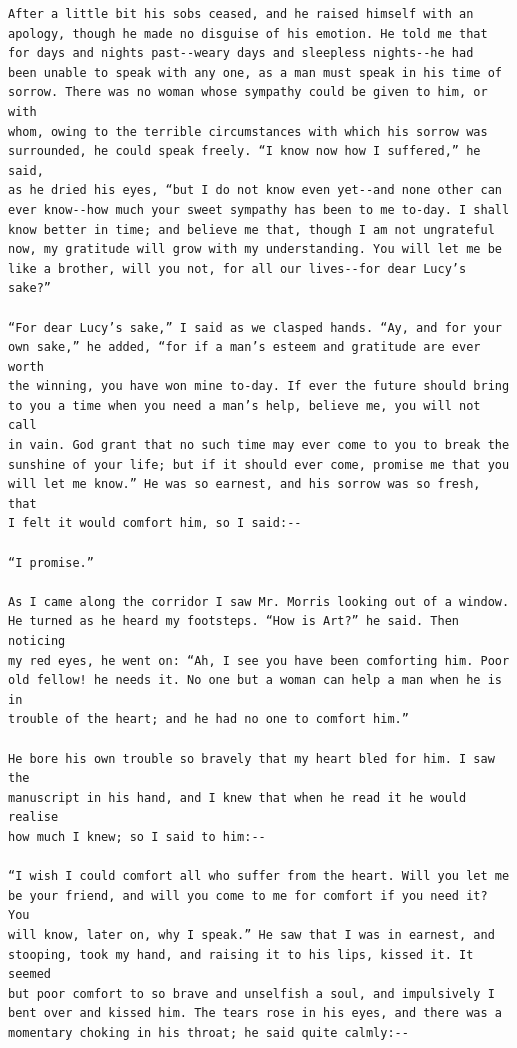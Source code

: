 \documentclass{article}
\begin{document}
\begin{verbatim}
After a little bit his sobs ceased, and he raised himself with an
apology, though he made no disguise of his emotion. He told me that
for days and nights past--weary days and sleepless nights--he had
been unable to speak with any one, as a man must speak in his time of
sorrow. There was no woman whose sympathy could be given to him, or with
whom, owing to the terrible circumstances with which his sorrow was
surrounded, he could speak freely. “I know now how I suffered,” he said,
as he dried his eyes, “but I do not know even yet--and none other can
ever know--how much your sweet sympathy has been to me to-day. I shall
know better in time; and believe me that, though I am not ungrateful
now, my gratitude will grow with my understanding. You will let me be
like a brother, will you not, for all our lives--for dear Lucy’s sake?”

“For dear Lucy’s sake,” I said as we clasped hands. “Ay, and for your
own sake,” he added, “for if a man’s esteem and gratitude are ever worth
the winning, you have won mine to-day. If ever the future should bring
to you a time when you need a man’s help, believe me, you will not call
in vain. God grant that no such time may ever come to you to break the
sunshine of your life; but if it should ever come, promise me that you
will let me know.” He was so earnest, and his sorrow was so fresh, that
I felt it would comfort him, so I said:--

“I promise.”

As I came along the corridor I saw Mr. Morris looking out of a window.
He turned as he heard my footsteps. “How is Art?” he said. Then noticing
my red eyes, he went on: “Ah, I see you have been comforting him. Poor
old fellow! he needs it. No one but a woman can help a man when he is in
trouble of the heart; and he had no one to comfort him.”

He bore his own trouble so bravely that my heart bled for him. I saw the
manuscript in his hand, and I knew that when he read it he would realise
how much I knew; so I said to him:--

“I wish I could comfort all who suffer from the heart. Will you let me
be your friend, and will you come to me for comfort if you need it? You
will know, later on, why I speak.” He saw that I was in earnest, and
stooping, took my hand, and raising it to his lips, kissed it. It seemed
but poor comfort to so brave and unselfish a soul, and impulsively I
bent over and kissed him. The tears rose in his eyes, and there was a
momentary choking in his throat; he said quite calmly:--


\end{verbatim}
\end{document}
